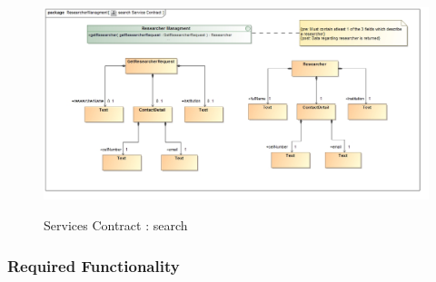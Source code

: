 \documentclass{article}
\begin{document}
		\begin{figure}[H]
			\includegraphics[width=\textwidth]{Rohan_Diagrams/searchServiceContract.jpg}  \\
			\caption{Services Contract : search}
		\end{figure}

	\subsubsection{Required Functionality}
		
\end{document}
